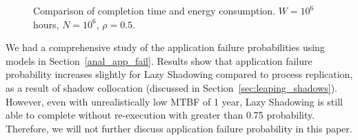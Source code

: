 \begin{figure}[!t]
	\begin{center}
	\end{center}
	\caption{Comparison of completion time and energy consumption. $W=10^6$ hours, $N=10^6$, $\rho=0.5$.}
	\label{fig:3}
\end{figure}

We had a comprehensive study of the application failure probabilities using models in Section~\ref{anal_app_fail}. Results show that application failure probability increases slightly for Lazy Shadowing compared to process replication, as a result of shadow collocation (discussed in Section~\ref{sec:leaping_shadows}). However, even with unrealistically low MTBF of 1 year, Lazy Shadowing is still able to complete without re-execution with greater than 0.75 probability. Therefore, we will not further discuss application failure probability in this paper.  



